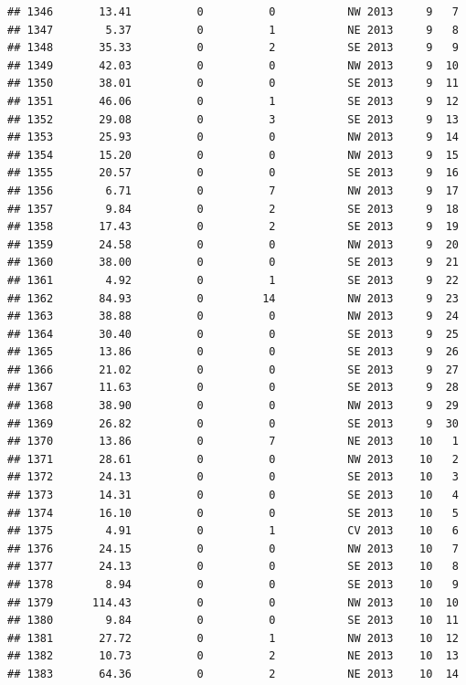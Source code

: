 \documentclass[
]{article}
\begin{document}
\begin{verbatim}
## 1346       13.41          0          0           NW 2013     9   7
## 1347        5.37          0          1           NE 2013     9   8
## 1348       35.33          0          2           SE 2013     9   9
## 1349       42.03          0          0           NW 2013     9  10
## 1350       38.01          0          0           SE 2013     9  11
## 1351       46.06          0          1           SE 2013     9  12
## 1352       29.08          0          3           SE 2013     9  13
## 1353       25.93          0          0           NW 2013     9  14
## 1354       15.20          0          0           NW 2013     9  15
## 1355       20.57          0          0           SE 2013     9  16
## 1356        6.71          0          7           NW 2013     9  17
## 1357        9.84          0          2           SE 2013     9  18
## 1358       17.43          0          2           SE 2013     9  19
## 1359       24.58          0          0           NW 2013     9  20
## 1360       38.00          0          0           SE 2013     9  21
## 1361        4.92          0          1           SE 2013     9  22
## 1362       84.93          0         14           NW 2013     9  23
## 1363       38.88          0          0           NW 2013     9  24
## 1364       30.40          0          0           SE 2013     9  25
## 1365       13.86          0          0           SE 2013     9  26
## 1366       21.02          0          0           SE 2013     9  27
## 1367       11.63          0          0           SE 2013     9  28
## 1368       38.90          0          0           NW 2013     9  29
## 1369       26.82          0          0           SE 2013     9  30
## 1370       13.86          0          7           NE 2013    10   1
## 1371       28.61          0          0           NW 2013    10   2
## 1372       24.13          0          0           SE 2013    10   3
## 1373       14.31          0          0           SE 2013    10   4
## 1374       16.10          0          0           SE 2013    10   5
## 1375        4.91          0          1           CV 2013    10   6
## 1376       24.15          0          0           NW 2013    10   7
## 1377       24.13          0          0           SE 2013    10   8
## 1378        8.94          0          0           SE 2013    10   9
## 1379      114.43          0          0           NW 2013    10  10
## 1380        9.84          0          0           SE 2013    10  11
## 1381       27.72          0          1           NW 2013    10  12
## 1382       10.73          0          2           NE 2013    10  13
## 1383       64.36          0          2           NE 2013    10  14

\end{verbatim}
\end{document}
